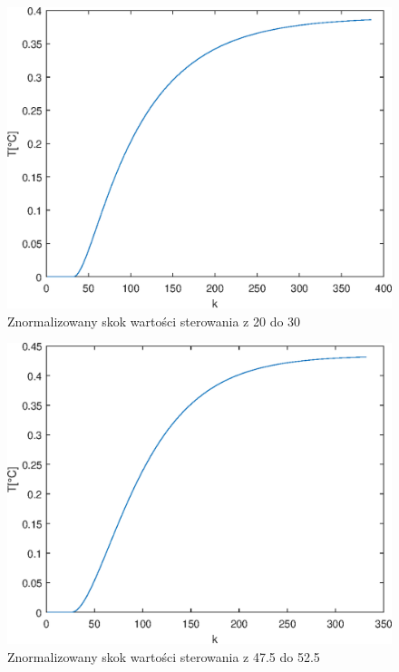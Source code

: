 \begin{figure}[h!]
	\centering
	\includegraphics[scale=1]{Rys/Skok2030_approx.eps}
	\caption{Znormalizowany skok wartości sterowania z \num{20} do \num{30}}
	\label{skokn1}
\end{figure}

\begin{figure}[h!]
	\centering
	\includegraphics[scale=1]{Rys/Skokcen_approx.eps}
	\caption{Znormalizowany skok wartości sterowania z \num{47,5} do \num{52,5}}
	\label{skokn2}
\end{figure}

